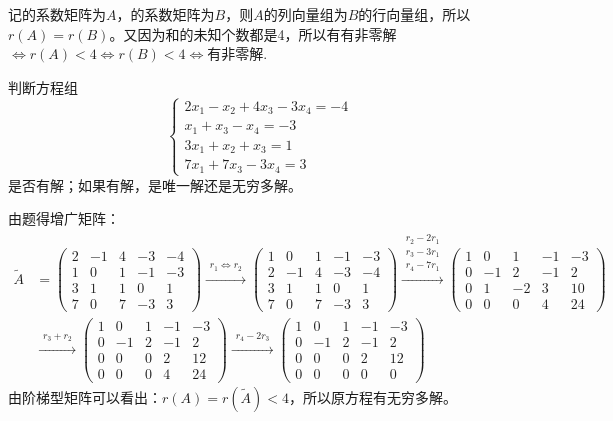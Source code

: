 \documentclass[a4paper]{report}
\begin{document}
\begin{zhengming}
记\uppercase\expandafter{}的系数矩阵为$A$，\uppercase\expandafter{}的系数矩阵为$B$，则$A$的列向量组为$B$的行向量组，所以$r(A)=r(B)$。又因为\uppercase\expandafter{}和\uppercase\expandafter{}的未知个数都是4，所以有\uppercase\expandafter{}有非零解$\Leftrightarrow r(A)<4\Leftrightarrow r(B)<4 \Leftrightarrow$\uppercase\expandafter{}有非零解.
\end{zhengming}

\EX 判断方程组
\begin{equation*}
\begin{cases}
2x_1-x_2+4x_3-3x_4=-4\\
x_1+x_3-x_4=-3\\
3x_1+x_2+x_3=1\\
7x_1+7x_3-3x_4=3
\end{cases}
\end{equation*}
是否有解；如果有解，是唯一解还是无穷多解。

\begin{jie}
由题得增广矩阵：
\begin{align*}
\widetilde{A}&=
\begin{pmatrix}
2&-1&4&-3&-4\\
1&0&1&-1&-3\\
3&1&1&0&1\\
7&0&7&-3&3
\end{pmatrix}\xrightarrow{\substack{r_1 \Leftrightarrow r_2}}{
\begin{pmatrix}
1&0&1&-1&-3\\
2&-1&4&-3&-4\\
3&1&1&0&1\\
7&0&7&-3&3
\end{pmatrix}
}\xrightarrow{\substack{r_2-2r_1\\ r_3-3r_1\\ r_4-7r_1}}{
\begin{pmatrix}
1&0&1&-1&-3\\
0&-1&2&-1&2\\
0&1&-2&3&10\\
0&0&0&4&24
\end{pmatrix}
}\\
&\xrightarrow{\substack{r_3+r_2}}{
\begin{pmatrix}
1&0&1&-1&-3\\
0&-1&2&-1&2\\
0&0&0&2&12\\
0&0&0&4&24
\end{pmatrix}
}\xrightarrow{\substack{r_4-2r_3}}{
\begin{pmatrix}
1&0&1&-1&-3\\
0&-1&2&-1&2\\
0&0&0&2&12\\
0&0&0&0&0
\end{pmatrix}
}
\end{align*}
由阶梯型矩阵可以看出：$r(A)=r(\widetilde{A})<4$，所以原方程有无穷多解。
\end{jie}
\end{document}
